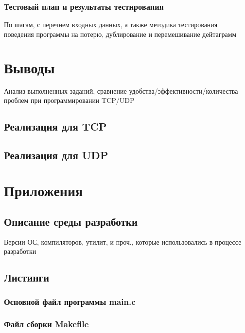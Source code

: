 \documentclass[12pt,a4paper]{report}
\begin{document}
\subsection{Тестовый план и результаты тестирования}
По шагам, с перечнем входных данных,
а также  методика тестирования поведения программы на потерю, дублирование и перемешивание дейтаграмм

\chapter{Выводы}
Анализ выполненных заданий, сравнение удобства/эффективности/количества проблем при программировании TCP/UDP
\section{Реализация для TCP}
\section{Реализация для UDP}

\chapter*{Приложения}
\section*{Описание среды разработки}
Версии ОС, компиляторов, утилит, и проч., которые использовались в процессе разработки
\section*{Листинги}
\subsection*{Основной файл программы main.c}
%
\subsection*{Файл сборки Makefile}
%
\end{document}
